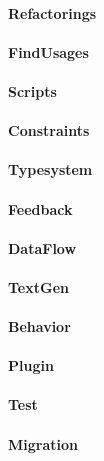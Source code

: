 \paragraph{Refactorings}
\lipsum[5]

\paragraph{FindUsages}
\lipsum[5]

\paragraph{Scripts}
\lipsum[5]

\paragraph{Constraints}
\lipsum[5]

\paragraph{Typesystem}
\lipsum[5]

\paragraph{Feedback}
\lipsum[5]

\paragraph{DataFlow}
\lipsum[5]

\paragraph{TextGen}
\lipsum[5]

\paragraph{Behavior}
\lipsum[5]

\paragraph{Plugin}
\lipsum[5]

\paragraph{Test}
\lipsum[5]

\paragraph{Migration}
\lipsum[5]

